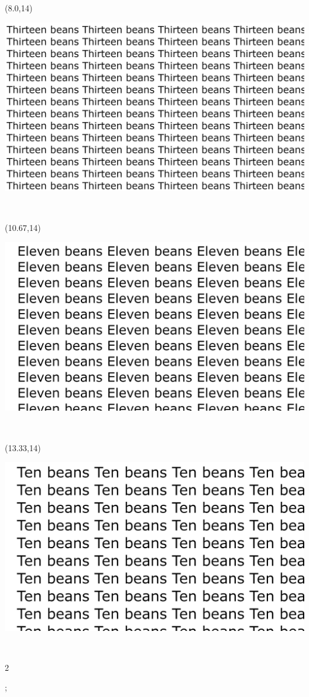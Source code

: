 \documentclass[a4paper]{article}
\newcommand{\myXthirteenBean}[0]{
\includegraphics[angle=00,height=0.057\paperheight,width=0.150\paperwidth]{thirteen_bean.png}
}
\newcommand{\myXelevenBean}[0]{
\includegraphics[angle=00,height=0.057\paperheight,width=0.150\paperwidth]{eleven_bean.png}
}
\newcommand{\myXtenBean}[0]{
\includegraphics[angle=00,height=0.057\paperheight,width=0.150\paperwidth]{ten_bean.png}
}
\newcommand{\mycard}[5]{%
	\vspace{0.35cm}
	\tiny #1 #2
	\parbox[t][0.058\paperheight][c]{0.150\paperwidth}{%
	\hspace{-0.65cm} \large#3\\
	}
}
\begin{document}
\begin{textblock}{2.67}(8.0,14)
\mycard{}{}{
\myXthirteenBean
}{}{} 
\end{textblock}

\begin{textblock}{2.67}(10.67,14)
\mycard{}{}{
\myXelevenBean
}{}{} 
\end{textblock}

\begin{textblock}{2.67}(13.33,14)
\mycard{}{}{
\myXtenBean
}{}{} 
\end{textblock}

\begin{tiny}2\end{tiny};
\end{document}
